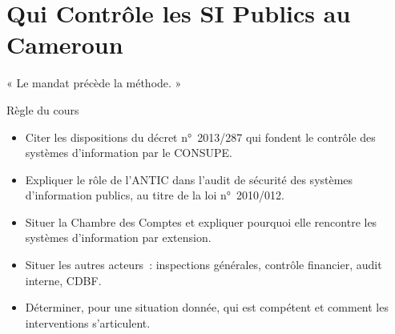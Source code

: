 
\chapter{Qui Contrôle les SI Publics au Cameroun}
\label{chap:institutions}

\epigraph{%
    « Le mandat précède la méthode. »%
}{Règle du cours}


\begin{boxobjectifs}
\begin{itemize}
    \item Citer les dispositions du décret n°~2013/287 qui fondent le
          contrôle des systèmes d'information par le CONSUPE.
    \item Expliquer le rôle de l'ANTIC dans l'audit de sécurité des
          systèmes d'information publics, au titre de la loi n°~2010/012.
    \item Situer la Chambre des Comptes et expliquer pourquoi elle rencontre
          les systèmes d'information par extension.
    \item Situer les autres acteurs~: inspections générales, contrôle
          financier, audit interne, CDBF.
    \item Déterminer, pour une situation donnée, qui est compétent et
          comment les interventions s'articulent.
\end{itemize}
\end{boxobjectifs}

\bigskip

